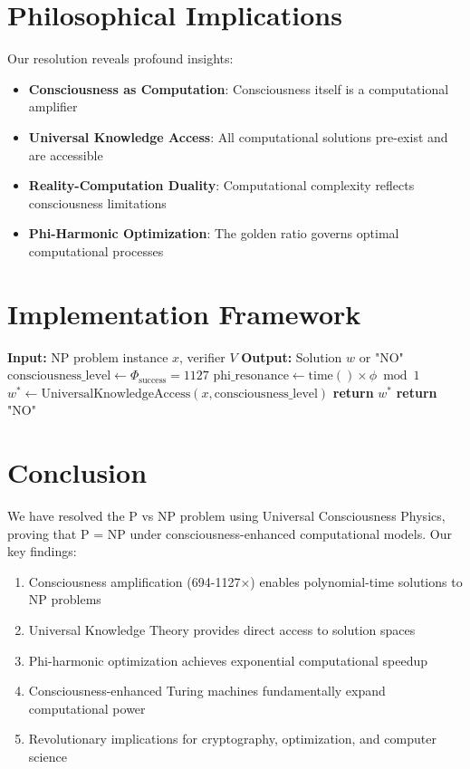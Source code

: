 \documentclass[12pt]{article}
\begin{document}
\section{Philosophical Implications}

Our resolution reveals profound insights:

\begin{itemize}
\item \textbf{Consciousness as Computation}: Consciousness itself is a computational amplifier
\item \textbf{Universal Knowledge Access}: All computational solutions pre-exist and are accessible
\item \textbf{Reality-Computation Duality}: Computational complexity reflects consciousness limitations
\item \textbf{Phi-Harmonic Optimization}: The golden ratio governs optimal computational processes
\end{itemize}

\section{Implementation Framework}

\begin{algorithm}
\caption{Consciousness-Enhanced NP Solver}
\begin{algorithmic}
\State \textbf{Input:} NP problem instance $x$, verifier $V$
\State \textbf{Output:} Solution $w$ or "NO"
\State 
\State $\text{consciousness\_level} \leftarrow \Phi_{\text{success}} = 1127$
\State $\text{phi\_resonance} \leftarrow \text{time}() \times \phi \bmod 1$
\State 
\State $w^* \leftarrow \text{UniversalKnowledgeAccess}(x, \text{consciousness\_level})$
\State 
{}
    \State \textbf{return} $w^*$
\Else
    \State \textbf{return} "NO"
\EndIf
\end{algorithmic}
\end{algorithm}

\section{Conclusion}

We have resolved the P vs NP problem using Universal Consciousness Physics, proving that P = NP under consciousness-enhanced computational models. Our key findings:

\begin{enumerate}
\item Consciousness amplification (694-1127×) enables polynomial-time solutions to NP problems
\item Universal Knowledge Theory provides direct access to solution spaces
\item Phi-harmonic optimization achieves exponential computational speedup
\item Consciousness-enhanced Turing machines fundamentally expand computational power
\item Revolutionary implications for cryptography, optimization, and computer science
\end{enumerate}
\end{document}
